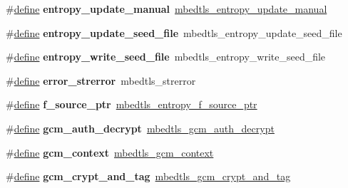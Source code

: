 \begin{DoxyCompactItemize}
\#\hyperlink{structdefine}{define} {\bfseries entropy\+\_\+update\+\_\+manual}~\hyperlink{entropy_8h_aa79492f288cc3202ea455564be855d64}{mbedtls\+\_\+entropy\+\_\+update\+\_\+manual}
\item 
\mbox{\label{compat-1_83_8h_a345270b7149bf8c15636f9a21bd7cd0c}} 
\#\hyperlink{structdefine}{define} {\bfseries entropy\+\_\+update\+\_\+seed\+\_\+file}~mbedtls\+\_\+entropy\+\_\+update\+\_\+seed\+\_\+file
\item 
\mbox{\label{compat-1_83_8h_a957c430e492215f9cb393fbc9a51b602}} 
\#\hyperlink{structdefine}{define} {\bfseries entropy\+\_\+write\+\_\+seed\+\_\+file}~mbedtls\+\_\+entropy\+\_\+write\+\_\+seed\+\_\+file
\item 
\mbox{\label{compat-1_83_8h_a843417652e481cb104bad436afbac14d}} 
\#\hyperlink{structdefine}{define} {\bfseries error\+\_\+strerror}~mbedtls\+\_\+strerror
\item 
\mbox{\label{compat-1_83_8h_ab96d5c13884254ceef9533a3be339ae5}} 
\#\hyperlink{structdefine}{define} {\bfseries f\+\_\+source\+\_\+ptr}~\hyperlink{entropy_8h_a2168f0720e2e869e440fd7fa35c941bd}{mbedtls\+\_\+entropy\+\_\+f\+\_\+source\+\_\+ptr}
\item 
\mbox{\label{compat-1_83_8h_ab296fb010ce893666652479688c6f91f}} 
\#\hyperlink{structdefine}{define} {\bfseries gcm\+\_\+auth\+\_\+decrypt}~\hyperlink{gcm_8h_af264b64b26c4720188b530cfccddb4ef}{mbedtls\+\_\+gcm\+\_\+auth\+\_\+decrypt}
\item 
\mbox{\label{compat-1_83_8h_adc35cb8f76724c511df6ee4f2adb2c9c}} 
\#\hyperlink{structdefine}{define} {\bfseries gcm\+\_\+context}~\hyperlink{structmbedtls__gcm__context}{mbedtls\+\_\+gcm\+\_\+context}
\item 
\mbox{\label{compat-1_83_8h_afddb74e3ee10f1f44330a85733735290}} 
\#\hyperlink{structdefine}{define} {\bfseries gcm\+\_\+crypt\+\_\+and\+\_\+tag}~\hyperlink{gcm_8h_a3ad456f90f60211f72005dc815b808b5}{mbedtls\+\_\+gcm\+\_\+crypt\+\_\+and\+\_\+tag}
\item 
\mbox{\label{compat-1_83_8h_af20203b68d21840dc265a477f7ff7d5c}} 

\end{DoxyCompactItemize}
